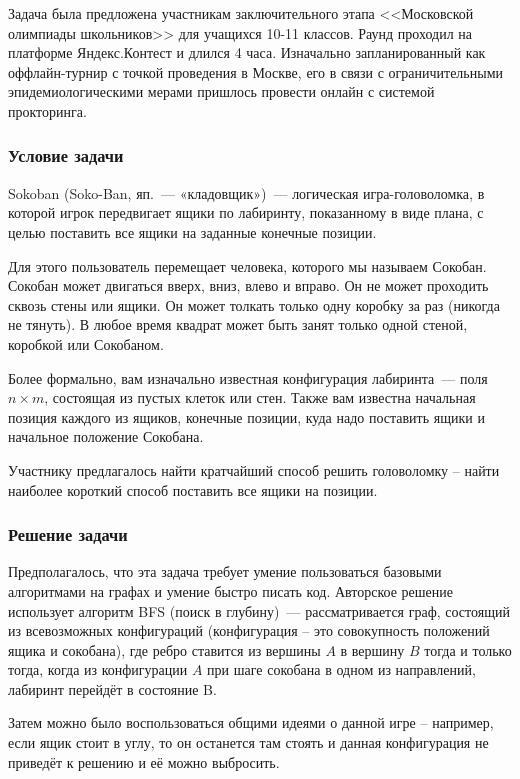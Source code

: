 \documentclass[a4paper]{article}
\begin{document}
Задача была предложена участникам заключительного этапа <<Московской олимпиады школьников>> для учащихся 10-11 классов. Раунд проходил на платформе Яндекс.Контест и длился 4 часа. Изначально запланированный как оффлайн-турнир с точкой проведения в Москве, его в связи с ограничительными эпидемиологическими мерами пришлось провести онлайн с системой прокторинга. 


\subsubsection{Условие задачи}

Sokoban (Soko-Ban, яп.~--- «кладовщик»)~--- логическая игра-головоломка, в которой игрок передвигает ящики по лабиринту, показанному в виде плана, с целью поставить все ящики на заданные конечные позиции. 


Для этого пользователь перемещает человека, которого мы называем Сокобан. Сокобан может двигаться вверх, вниз, влево и вправо. Он не может проходить сквозь стены или ящики. Он может толкать только одну коробку за раз (никогда не тянуть). В любое время квадрат может быть занят только одной стеной, коробкой или Сокобаном.

Более формально, вам изначально известная конфигурация лабиринта~--- поля $n\times m$, состоящая из пустых клеток или стен. Также вам известна начальная позиция каждого из ящиков, конечные позиции, куда надо поставить ящики и начальное положение Сокобана.

Участнику предлагалось найти кратчайший способ решить головоломку -- найти наиболее короткий способ поставить все ящики на позиции.





\subsubsection{Решение задачи}

Предполагалось, что эта задача требует умение пользоваться базовыми алгоритмами на графах и умение быстро писать код. Авторское решение использует алгоритм BFS (поиск в глубину)~--- рассматривается граф, состоящий из всевозможных конфигураций (конфигурация -- это совокупность положений ящика и сокобана), где ребро ставится из вершины $A$ в вершину $B$ тогда и только тогда, когда из конфигурации $A$ при шаге сокобана в одном из направлений, лабиринт перейдёт в состояние B. 

Затем можно было воспользоваться общими идеями о данной игре -- например, если ящик стоит в углу, то он останется там стоять и данная конфигурация не приведёт к решению и её можно выбросить.
\end{document}
